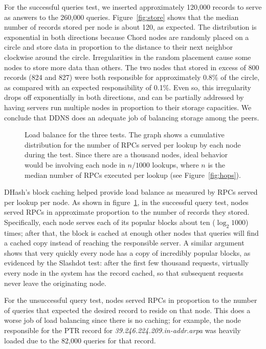 For the successful queries test, we inserted approximately 120,000
records to serve as answers to the 260,000 queries.
Figure~\ref{fig:store} shows that the median number of
records stored per node is about 120, as expected.
The distribution is exponential in both directions because
Chord nodes are randomly placed on a circle and store data
in proportion to the distance to their next neighbor clockwise
around the circle.  Irregularities in the random placement cause
some nodes to store more data than others.
The two nodes that stored in excess of 800
records (824 and 827) were both responsible for approximately
0.8\% of the circle, as compared with an expected 
responsibility of 0.1\%.
Even so, this irregularity drops off exponentially in both
directions, and can be partially addressed by having servers
run multiple nodes in proportion to their storage capacities.
We conclude that DDNS does an adequate job of balancing
storage among the peers.

\begin{figure}
\caption{Load balance for the three tests.
The graph shows a cumulative distribution for the number
of RPCs served per lookup by each node during the test.
Since there are a thousand nodes, ideal behavior would be
involving each node in $n/1000$ lookups, where $n$
is the median number of RPCs executed per lookup (see Figure~\ref{fig:hops}).}
\label{fig:both-rpc}
\end{figure}

DHash's block caching helped provide load balance as
measured by RPCs served per lookup per node.
As shown in figure~\ref{fig:both-rpc},
in the successful query test, nodes served RPCs in
approximate proportion to the number of records they stored.
Specifically, each node serves each of its popular blocks about
ten ($\log_2 1000$) times; after that, the block is cached
at enough other nodes that queries will find a cached copy
instead of reaching the responsible server.
A similar argument shows that very quickly every node has
a copy of incredibly popular blocks, as evidenced by the
Slashdot test: after the first few thousand requests, virtually
every node in the system has the record cached, so that
subsequent requests never leave the originating node.

For the unsuccessful query test, nodes served RPCs in 
proportion to the number of queries that expected the
desired record to reside on that node.
This does a worse job of load balancing since there is
no caching; for example, the node responsible for the
PTR record for {\em 39.246.224.209.in-addr.arpa} was
heavily loaded due to the 82,000 queries for that record.

